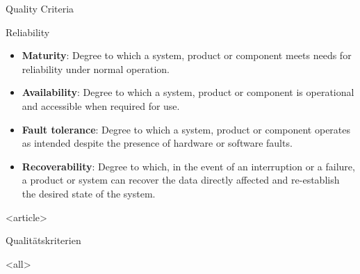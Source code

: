 \begin{frame}{Quality Criteria}
	
	Reliability
	\begin{itemize}
		\item \textbf{Maturity}: Degree to which a system, product or component meets needs for reliability under normal operation.
		\item \textbf{Availability}: Degree to which a system, product or component is operational and accessible when required for use.
		\item \textbf{Fault tolerance}: Degree to which a system, product or component operates as intended despite the presence of hardware or software faults.
		\item \textbf{Recoverability}: Degree to which, in the event of an interruption or a failure, a product or system can recover the data directly affected and re-establish the desired state of the system.
	\end{itemize}
\end{frame}

\mode
<article>

\begin{frame}{Qualitätskriterien}
	\begin{figure}[!h]
		\resizebox{!}{.78\textheight}{%
			
		}%
	\end{figure}
\end{frame}



\exercises

\mode
<all>



